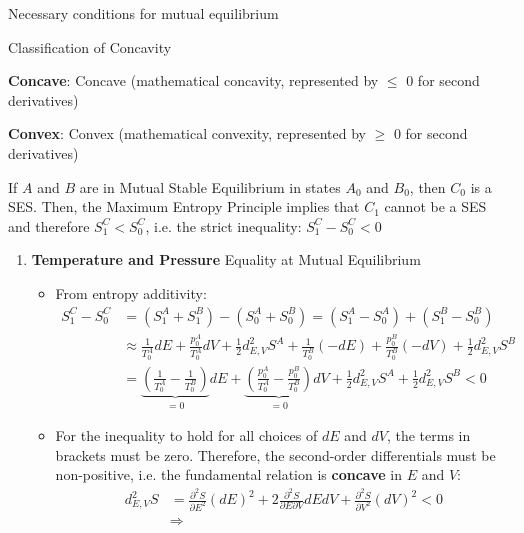 \begin{thm}
    Necessary conditions for mutual equilibrium

    \begin{zhu}
        Classification of Concavity
        \par\indent
        \textbf{Concave}: Concave (mathematical concavity, represented by $\leq$ 0 for second derivatives)
        \par\indent
        \textbf{Convex}: Convex (mathematical convexity, represented by $\geq$ 0 for second derivatives)        
    \end{zhu}
    If \( A \) and \( B \) are in Mutual Stable Equilibrium in states \( A_0 \) and \( B_0 \), then \( C_0 \) is a SES. 
    Then, the Maximum Entropy Principle implies that \( C_1 \) cannot be a SES and therefore \( S^C_1 < S^C_0 \), 
    i.e. the strict inequality:
    \(S^C_1 - S^C_0 < 0\)
    \begin{enumerate}
        \item \textbf{Temperature and Pressure} Equality at Mutual Equilibrium
        \begin{itemize}
            \item From entropy additivity:
        \begin{align*}
                S^C_1 - S^C_0 &= (S^A_1 + S^B_1) - (S^A_0 + S^B_0) = (S^A_1 - S^A_0) + (S^B_1 - S^B_0)\\
                &\approx \frac{1}{T^A_0} dE + \frac{p^A_0}{T^A_0} dV + \frac{1}{2} d^2_{E,V} S^A 
                + \frac{1}{T^B_0} (-dE) + \frac{p^B_0}{T^B_0} (-dV) + \frac{1}{2} d^2_{E,V} S^B \\
                &= \underbrace{\left( \frac{1}{T^A_0} - \frac{1}{T^B_0} \right)}_{=0} dE 
                + \underbrace{\left( \frac{p^A_0}{T^A_0} - \frac{p^B_0}{T^B_0} \right)}_{=0} dV 
                + \frac{1}{2} d^2_{E,V} S^A + \frac{1}{2} d^2_{E,V} S^B < 0
        \end{align*}
        \item For the inequality to hold for all choices of \( dE \) and \( dV \), 
        the terms in brackets must be zero. Therefore, the second-order differentials must be non-positive, 
        i.e. the fundamental relation is \textbf{concave} in \( E \) and \( V \):
\begin{align*}
            d_{E,V}^2 S &= \frac{\partial^2 S}{\partial E^2} (dE)^2 + 2 \frac{\partial^2 S}{\partial E \partial V} dEdV + \frac{\partial^2 S}{\partial V^2} (dV)^2 < 0
            \\&\Rightarrow

\end{align*}
\end{itemize}
\end{enumerate}
\end{thm}
